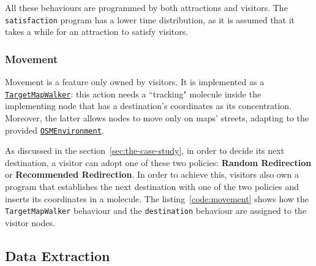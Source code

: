 \noindent
All these behaviours are programmed by both attractions and visitors.
The \texttt{satisfaction} program has a lower time distribution, as it is assumed that it takes a while for an attraction to satisfy visitors.

\subsubsection{Movement}
Movement is a feature only owned by visitors.
It is implemented as a \href{https://alchemistsimulator.github.io/reference/kdoc/alchemist/it.unibo.alchemist.model.implementations.actions/-target-map-walker/index.html}{\texttt{TargetMapWalker}}: this action needs a ``tracking" molecule inside the implementing node that has a destination's coordinates as its concentration.
Moreover, the latter allows nodes to move only on maps' streets, adapting to the provided \href{https://alchemistsimulator.github.io/reference/kdoc/alchemist/it.unibo.alchemist.model.implementations.environments/-o-s-m-environment/}{\texttt{OSMEnvironment}}.

As discussed in the section~\ref{sec:the-case-study}, in order to decide its next destination, a visitor can adopt one of these two policies: \textbf{Random Redirection} or \textbf{Recommended Redirection}.
In order to achieve this, visitors also own a program that establishes the next destination with one of the two policies and inserts its coordinates in a molecule.
The listing~\ref{code:movement} shows how the \texttt{TargetMapWalker} behaviour and the \texttt{destination} behaviour are assigned to the visitor nodes.



\subsection{Data Extraction}\label{subsec:data-extraction}